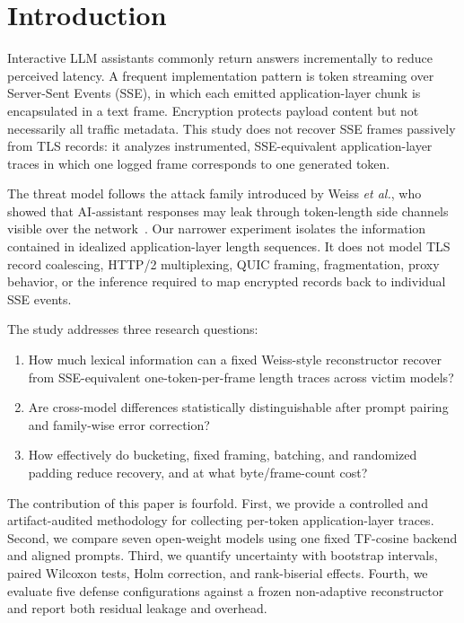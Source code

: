 \documentclass[journal,article,submit,pdftex,moreauthors]{Definitions/mdpi}
\begin{document}
\section{Introduction}
Interactive LLM assistants commonly return answers incrementally to reduce perceived latency. A frequent implementation pattern is token streaming over Server-Sent Events (SSE), in which each emitted application-layer chunk is encapsulated in a text frame. Encryption protects payload content but not necessarily all traffic metadata. This study does not recover SSE frames passively from TLS records: it analyzes instrumented, SSE-equivalent application-layer traces in which one logged frame corresponds to one generated token.

The threat model follows the attack family introduced by Weiss \emph{et al.}, who showed that AI-assistant responses may leak through token-length side channels visible over the network~\cite{weiss2024prompt}. Our narrower experiment isolates the information contained in idealized application-layer length sequences. It does not model TLS record coalescing, HTTP/2 multiplexing, QUIC framing, fragmentation, proxy behavior, or the inference required to map encrypted records back to individual SSE events.

The study addresses three research questions:
\begin{enumerate}[label=\textbf{RQ\arabic*:},leftmargin=3.8em]
    \item How much lexical information can a fixed Weiss-style reconstructor recover from SSE-equivalent one-token-per-frame length traces across victim models?
    \item Are cross-model differences statistically distinguishable after prompt pairing and family-wise error correction?
    \item How effectively do bucketing, fixed framing, batching, and randomized padding reduce recovery, and at what byte/frame-count cost?
\end{enumerate}

The contribution of this paper is fourfold. First, we provide a controlled and artifact-audited methodology for collecting per-token application-layer traces. Second, we compare seven open-weight models using one fixed TF-cosine backend and aligned prompts. Third, we quantify uncertainty with bootstrap intervals, paired Wilcoxon tests, Holm correction, and rank-biserial effects. Fourth, we evaluate five defense configurations against a frozen non-adaptive reconstructor and report both residual leakage and overhead.
\end{document}
